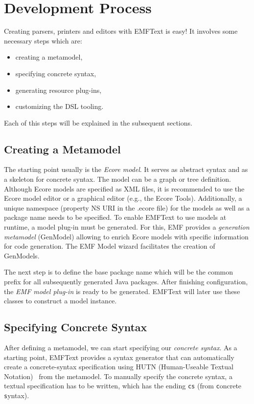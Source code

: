 \chapter{Development Process}

Creating parsers, printers and editors with EMFText is easy! It involves some
necessary steps which are:
\begin{itemize}
  \item creating a metamodel,
  \item specifying concrete syntax,
  \item generating resource plug-ins,
  \item customizing the DSL tooling.
\end{itemize}

Each of this steps will be explained in the subsequent sections.

\section{Creating a Metamodel}

The starting point usually is the \emph{Ecore model}. It serves as 
abstract syntax and as a skeleton for concrete syntax. The model can be a graph or tree 
definition. Although Ecore models are specified as XML files, it is recommended 
to use the Ecore model editor or a graphical editor (e.g., the Ecore Tools).
Additionally, a unique namespace (property NS URI in the .ecore file) for the models as well as a package 
name needs to be specified. To enable EMFText to use models at runtime, a model 
plug-in must be generated. For this, EMF provides a \emph{generation
metamodel} (GenModel) allowing to enrich Ecore models with specific information
for code generation. The EMF Model wizard facilitates the creation of GenModels.

The next step is to define the base package name which will be the common prefix 
for all subsequently generated Java packages. After finishing configuration, the 
\emph{EMF model plug-in} is ready to be generated. EMFText will later use
these classes to construct a model instance.

\section{Specifying Concrete Syntax}
\label{sec:process_specification}

After defining a metamodel, we can start specifying our
\emph{concrete syntax}. As a starting point, EMFText provides a syntax generator that can
automatically create a concrete-syntax specification using HUTN (Human-Useable Textual Notation)~\cite{HUTN} from the 
metamodel. To manually specify the concrete syntax, a textual specification has to 
be written, which has the ending \texttt{cs} (from \texttt{c}oncrete
\texttt{s}yntax). 

